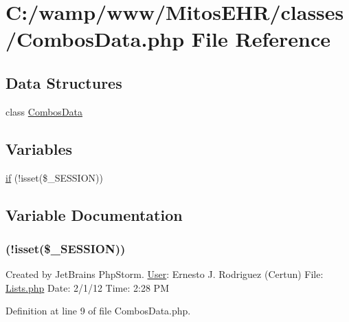 \hypertarget{_combos_data_8php}{\section{\-C\-:/wamp/www/\-Mitos\-E\-H\-R/classes/\-Combos\-Data.php \-File \-Reference}
\label{_combos_data_8php}
}
\subsection*{\-Data \-Structures}
\begin{DoxyCompactItemize}
\item 
class \hyperlink{class_combos_data}{\-Combos\-Data}
\end{DoxyCompactItemize}
\subsection*{\-Variables}
\begin{DoxyCompactItemize}
\item 
\hyperlink{_combos_data_8php_a8ceca98aa29914fd2479a84a8d2242fb}{if} (!isset(\$\-\_\-\-S\-E\-S\-S\-I\-O\-N))
\end{DoxyCompactItemize}


\subsection{\-Variable \-Documentation}
\hypertarget{_combos_data_8php_a8ceca98aa29914fd2479a84a8d2242fb}{
\subsubsection[{if}]{(!isset(\$\-\_\-\-S\-E\-S\-S\-I\-O\-N))}}\label{_combos_data_8php_a8ceca98aa29914fd2479a84a8d2242fb}
\-Created by \-Jet\-Brains \-Php\-Storm. \hyperlink{class_user}{\-User}\-: \-Ernesto \-J. \-Rodriguez (\-Certun) \-File\-: \hyperlink{_lists_8php}{\-Lists.\-php} \-Date\-: 2/1/12 \-Time\-: 2\-:28 \-P\-M 

\-Definition at line 9 of file \-Combos\-Data.\-php.

